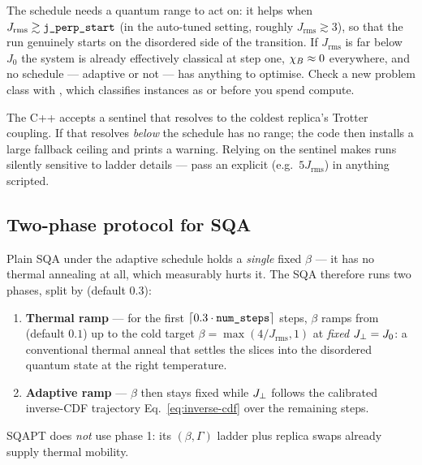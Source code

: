 \begin{warnbox}
The schedule needs a quantum range to act on: it helps when
$J_{\mathrm{rms}}\gtrsim\code{j\_perp\_start}$ (in the auto-tuned setting,
roughly $J_{\mathrm{rms}}\gtrsim3$), so that the run genuinely starts on the
disordered side of the transition. If $J_{\mathrm{rms}}$ is far below
$J_0$ the system is already effectively classical at step one,
$\chi_B\approx0$ everywhere, and no schedule --- adaptive or not --- has
anything to optimise. Check a new problem class with
, which classifies instances as
 or  before you spend compute.
\end{warnbox}

\begin{warnbox}
The C++  accepts a sentinel 
that resolves to the coldest replica's Trotter coupling. If that resolves
\emph{below}  the schedule has no range; the code then
installs a large fallback ceiling and prints a  warning. Relying
on the sentinel makes runs silently sensitive to ladder details --- pass an
explicit  (e.g.\ $5J_{\mathrm{rms}}$) in anything
scripted.
\end{warnbox}

\subsection{Two-phase protocol for SQA}

Plain SQA under the adaptive schedule holds a \emph{single} fixed $\beta$
--- it has no thermal annealing at all, which measurably hurts it. The SQA
 therefore runs two phases, split by
 (default $0.3$):
\begin{enumerate}
\item \textbf{Thermal ramp} --- for the first
$\lceil0.3\cdot\code{num\_steps}\rceil$ steps, $\beta$ ramps from
 (default $0.1$) up to the cold target
$\beta=\max(4/J_{\mathrm{rms}},1)$ at \emph{fixed} $J_{\perp}=J_0$: a conventional
thermal anneal that settles the slices into the disordered quantum state at
the right temperature.
\item \textbf{Adaptive ramp} --- $\beta$ then stays fixed while $J_{\perp}$
follows the calibrated inverse-CDF trajectory
Eq.~\eqref{eq:inverse-cdf} over the remaining steps.
\end{enumerate}
SQAPT does \emph{not} use phase 1: its $(\beta,\Gamma)$ ladder plus replica
swaps already supply thermal mobility.


